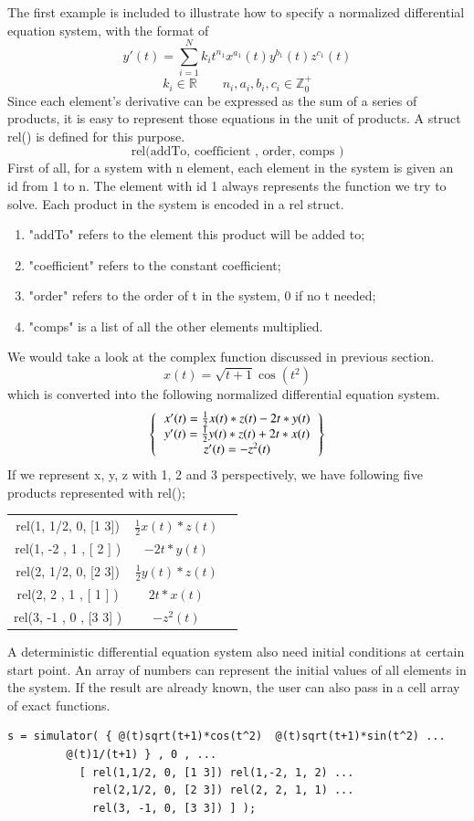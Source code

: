 \documentclass[12pt]{article}
\begin{document}
The first example is included to illustrate how to specify a normalized differential equation system, with the format of 
$$
y'(t) = \sum^N_{i=1} k_{i} t^{n_{1}} x^{a_{1}}(t) y^{b_{1}}(t) z^{c_{1}}(t) 
$$
$$
k_i \in \mathbb{R} \qquad n_i, a_i, b_i, c_i \in \mathbb{Z}^+_0
$$
Since each element's derivative can be expressed as the sum of a series of products, it is easy to represent those equations in the unit of products. A struct rel() is defined for this purpose.
$$ \text{rel(addTo, coefficient , order, comps )}$$
First of all, for a system with n element, each element in the system is given an id from 1 to n. The element with id 1 always represents the function we try to solve. Each product in the system is encoded in a rel struct.
\begin{enumerate}
\item "addTo" refers to the element this product will be added to;
\item "coefficient" refers to the constant coefficient;
\item "order" refers to the order of t in the system, 0 if no t needed; 
\item "comps" is a list of all the other elements multiplied.
\end{enumerate}
We would take a look at the complex function discussed in previous section.
\begin{equation}
x(t) = \sqrt{t+1}\cos(t^2)
\end{equation}
which is converted into the following normalized differential equation system.
\[
\left \{
  \begin{tabular}{ccc}
  $x'(t) = \frac{1}{2}x(t)*z(t) - 2t*y(t)$ \\
  $y'(t) = \frac{1}{2}y(t)*z(t) + 2t*x(t)$ \\
  $z'(t) = -z^{2}(t)$
  \end{tabular}
\right \}
\]
If we represent x, y, z with 1, 2 and 3 perspectively, we have following five products represented with rel();
\begin{tabular}{ccc}
  rel(1, 1/2, 0, [1 3]) & $\frac{1}{2}x(t)*z(t)$  \\
  rel(1, -2 , 1 , [ 2 ] ) &  $- 2t*y(t)$ \\
  rel(2, 1/2, 0, [2 3]) & $\frac{1}{2}y(t)*z(t)$  \\
  rel(2, 2 , 1 , [ 1 ] ) &  $2t*x(t)$ \\
  rel(3, -1 , 0 , [3 3] ) &  $-z^{2}(t)$
\end{tabular}

A deterministic differential equation system also need initial conditions at certain start point. An array of numbers can represent the initial values of all elements in the system. If the result are already known, the user can also pass in a cell array of exact functions.
\begin{lstlisting}
s = simulator( { @(t)sqrt(t+1)*cos(t^2)  @(t)sqrt(t+1)*sin(t^2) ...
		 @(t)1/(t+1) } , 0 , ...
  	       [ rel(1,1/2, 0, [1 3]) rel(1,-2, 1, 2) ...
    		 rel(2,1/2, 0, [2 3]) rel(2, 2, 1, 1) ...
       		 rel(3, -1, 0, [3 3]) ] );
\end{lstlisting}
\end{document}
